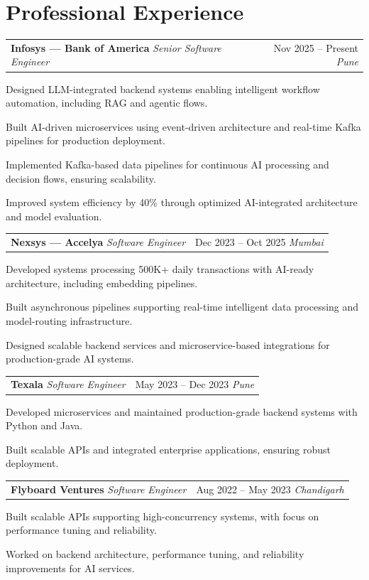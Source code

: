 \documentclass[10pt, letterpaper]{article}
\makeatletter
\newcommand{\resumeitem}[1]{\item\small{#1}}
\newcommand{\jobheading}[4]{%
  \noindent
  \begin{tabularx}{\textwidth}{@{}X r@{}}
    \textbf{\color{primary}#1} \textbar{} \textit{\small\color{subtle}#2} &
    \small\color{subtle}#3 \textbar{} \textit{\small #4}
  \end{tabularx}%
}
\makeatother
\begin{document}
\section{Professional Experience}

\jobheading{Infosys --- Bank of America}{Senior Software Engineer}{Nov 2025 -- Present}{Pune}

\begin{jobitems}
\resumeitem{Designed LLM-integrated backend systems enabling intelligent workflow automation, including RAG and agentic flows.}
\resumeitem{Built AI-driven microservices using event-driven architecture and real-time Kafka pipelines for production deployment.}
\resumeitem{Implemented Kafka-based data pipelines for continuous AI processing and decision flows, ensuring scalability.}
\resumeitem{Improved system efficiency by 40\% through optimized AI-integrated architecture and model evaluation.}
\end{jobitems}

\jobheading{Nexsys --- Accelya}{Software Engineer}{Dec 2023 -- Oct 2025}{Mumbai}

\begin{jobitems}
\resumeitem{Developed systems processing 500K+ daily transactions with AI-ready architecture, including embedding pipelines.}
\resumeitem{Built asynchronous pipelines supporting real-time intelligent data processing and model-routing infrastructure.}
\resumeitem{Designed scalable backend services and microservice-based integrations for production-grade AI systems.}
\end{jobitems}

\jobheading{Texala}{Software Engineer}{May 2023 -- Dec 2023}{Pune}

\begin{jobitems}
\resumeitem{Developed microservices and maintained production-grade backend systems with Python and Java.}
\resumeitem{Built scalable APIs and integrated enterprise applications, ensuring robust deployment.}
\end{jobitems}

\jobheading{Flyboard Ventures}{Software Engineer}{Aug 2022 -- May 2023}{Chandigarh}

\begin{jobitems}
\resumeitem{Built scalable APIs supporting high-concurrency systems, with focus on performance tuning and reliability.}
\resumeitem{Worked on backend architecture, performance tuning, and reliability improvements for AI services.}
\end{jobitems}
\end{document}
